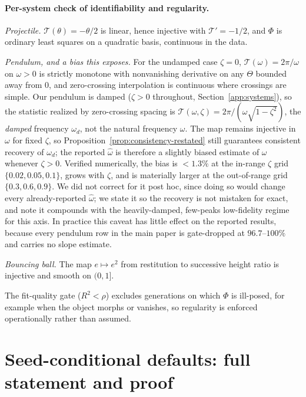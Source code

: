 \documentclass[10pt,twocolumn,letterpaper]{article}
\begin{document}
\paragraph{Per-system check of identifiability and regularity.}
\emph{Projectile.} $\mathcal{T}(\theta)=-\theta/2$ is linear, hence injective
with $\mathcal{T}'=-1/2$, and $\Phi$ is ordinary least squares on a quadratic
basis, continuous in the data.

\emph{Pendulum, and a bias this exposes.} For the undamped case $\zeta=0$,
$\mathcal{T}(\omega)=2\pi/\omega$ on $\omega>0$ is strictly monotone with
nonvanishing derivative on any $\Theta$ bounded away from $0$, and
zero-crossing interpolation is continuous where crossings are simple. Our
pendulum is damped ($\zeta>0$ throughout,
Section~\ref{app:systems}), so the statistic realized by zero-crossing
spacing is $\mathcal{T}(\omega,\zeta)=2\pi/(\omega\sqrt{1-\zeta^2})$, the
\emph{damped} frequency $\omega_d$, not the natural frequency $\omega$. The
map remains injective in $\omega$ for fixed $\zeta$, so
Proposition~\ref{prop:consistency-restated} still guarantees consistent
recovery of $\omega_d$; the reported $\hat\omega$ is therefore a slightly
biased estimate of $\omega$ whenever $\zeta>0$. Verified numerically, the
bias is $<1.3\%$ at the in-range $\zeta$ grid $\{0.02,0.05,0.1\}$, grows with
$\zeta$, and is materially larger at the out-of-range grid
$\{0.3,0.6,0.9\}$. We did not correct for it post hoc, since doing so would
change every already-reported $\hat\omega$; we state it so the recovery is
not mistaken for exact, and note it compounds with the heavily-damped,
few-peaks low-fidelity regime for this axis. In practice this caveat has
little effect on the reported results, because every pendulum row in the main
paper is gate-dropped at $96.7$--$100\%$ and carries no slope estimate.

\emph{Bouncing ball.} The map $e\mapsto e^2$ from restitution to successive
height ratio is injective and smooth on $(0,1]$.

The fit-quality gate ($R^2<\rho$) excludes generations on which $\Phi$ is
ill-posed, for example when the object morphs or vanishes, so regularity
is enforced operationally rather than assumed.

\section{Seed-conditional defaults: full statement and proof}
\label{app:seed}
\end{document}
